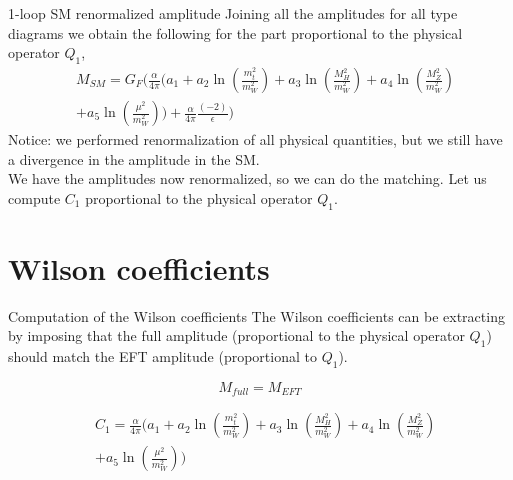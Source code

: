 \documentclass[11pt]{beamer}
\begin{document}
\begin{frame}{1-loop SM renormalized amplitude}
    Joining all the amplitudes for all type diagrams we obtain the following for the part proportional to the physical operator $Q_1$,
    \small
\begin{equation}
\begin{split}
  & M_{SM} = 
  G_F ( \frac{\alpha}{4 \pi}( a_1 
+ a_2  \ln\left(\frac{m_t^2}{m_W^2} \right)
+ a_3  \ln\left(\frac{M_H^2}{m_W^2} \right)
+ a_4 \ln\left(\frac{M_Z^2}{m_W^2} \right)\\
&
+ a_5 \ln\left(\frac{\mu^2}{m_W^2}  \right) )+ \frac{\alpha}{4 \pi}\frac{(-2)}{\epsilon})
\end{split}
\end{equation}
Notice: we performed renormalization of all physical quantities, but we still have a divergence in the amplitude in the SM.
\vspace{.5cm}
\\
We have the amplitudes now renormalized, so we can do the matching. Let us compute $C_1$ proportional to the physical operator $Q_1$.
\end{frame}

\section{Wilson coefficients}
\begin{frame}{Computation of the Wilson coefficients}
    The Wilson coefficients can be extracting by imposing that the full amplitude (proportional to the physical operator $Q_1$) should match the EFT amplitude (proportional to $Q_1$).

\begin{equation}
    M_{full} = M_{EFT}
\end{equation}

\begin{equation}
\begin{split}
  & C_1 = \frac{\alpha}{4 \pi}( a_1 
+ a_2  \ln\left(\frac{m_t^2}{m_W^2} \right)
+ a_3  \ln\left(\frac{M_H^2}{m_W^2} \right)
+ a_4 \ln\left(\frac{M_Z^2}{m_W^2} \right)\\
&
+ a_5 \ln\left(\frac{\mu^2}{m_W^2}  \right) )
\end{split}
\end{equation}
\end{frame}
\end{document}
